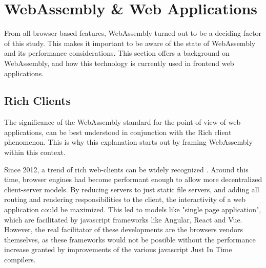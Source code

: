 


\section{WebAssembly \& Web Applications}
\label{sec:background-web}

From all browser-based features, WebAssembly turned out to be a deciding factor of this study. This makes it important to be aware of the state of WebAssembly and its performance considerations.
This section offers a background on WebAssembly, and how this technology is currently used in frontend web applications.

\subsection{Rich Clients}
\label{sec:background-web-rich}

The significance of the WebAssembly standard for the point of view of web applications, can be best understood in conjunction with the Rich client phenomenon. 
This is why this explanation starts out by framing WebAssembly within this context.




Since 2012, a trend of rich web-clients can be widely recognized \cite{hamilton_client-side_2014, panidi_hybrid_2015, kulawiak_analysis_2019}.
Around this time, browser engines had become performant enough to allow more decentralized client-server models.
By reducing servers to just static file servers, and adding all routing and rendering responsibilities to the client, the interactivity of a web application could be maximized. 
This led to models like "single page application", which are facilitated by javascript frameworks like Angular, React and Vue.
However, the real facilitator of these developments are the browsers vendors themselves, as these frameworks would not be possible without the performance increase granted by improvements of the various javascript Just In Time compilers. 

